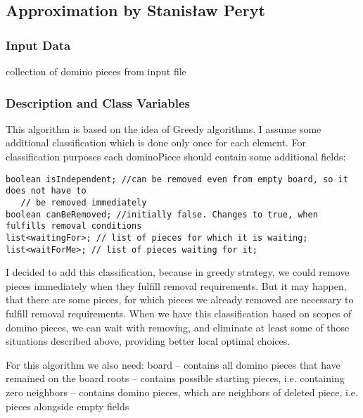 \subsection{Approximation by Stanisław Peryt}

\subsubsection{Input Data}
collection of domino pieces from input file
\subsubsection{Description and Class Variables}
This algorithm is based on the idea of Greedy algorithms. I assume some additional classification
which is done only once for each element. For classification purposes each dominoPiece should
contain some additional fields:

\begin{verbatim}
boolean isIndependent; //can be removed even from empty board, so it does not have to 
   // be removed immediately
boolean canBeRemoved; //initially false. Changes to true, when fulfills removal conditions
list<waitingFor>; // list of pieces for which it is waiting;
list<waitForMe>; // list of pieces waiting for it;
\end{verbatim}

I decided to add this classification, because in greedy strategy, we could remove pieces immediately
when they fulfill removal requirements. But it may happen, that there are some pieces, for which
pieces we already removed are necessary to fulfill removal requirements. When we have this
classification based on scopes of domino pieces, we can wait with removing, and eliminate at least
some of those situations described above, providing better local optimal choices.

For this algorithm we also need:
board – contains all domino pieces that have remained on the board
roots – contains possible starting pieces, i.e. containing zero
neighbors – contains domino pieces, which are neighbors of deleted piece, i.e. pieces alongside empty fields
